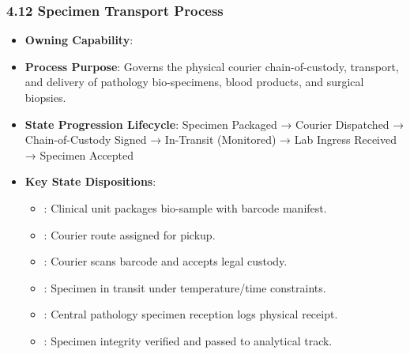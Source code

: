 \par\smallskip
{}\label{rad:processes:248}
\subsubsection*{4.12 Specimen Transport Process}
\label{rad:processes:249}

\begin{itemize}

\item 
\textbf{Owning Capability}: \texttt{}



\item 
\textbf{Process Purpose}: Governs the physical courier chain-of-custody, transport, and delivery of pathology bio-specimens, blood products, and surgical biopsies.



\item 
\textbf{State Progression Lifecycle}: Specimen Packaged → Courier Dispatched → Chain-of-Custody Signed → In-Transit (Monitored) → Lab Ingress Received → Specimen Accepted



\item 
\textbf{Key State Dispositions}:


\begin{itemize}

\item 
\texttt{}: Clinical unit packages bio-sample with barcode manifest.



\item 
\texttt{}: Courier route assigned for pickup.



\item 
\texttt{}: Courier scans barcode and accepts legal custody.



\item 
\texttt{}: Specimen in transit under temperature/\allowbreak{}time constraints.



\item 
\texttt{}: Central pathology specimen reception logs physical receipt.



\item 
\texttt{}: Specimen integrity verified and passed to analytical track.



\end{itemize}


\end{itemize}
\label{rad:processes:261}

